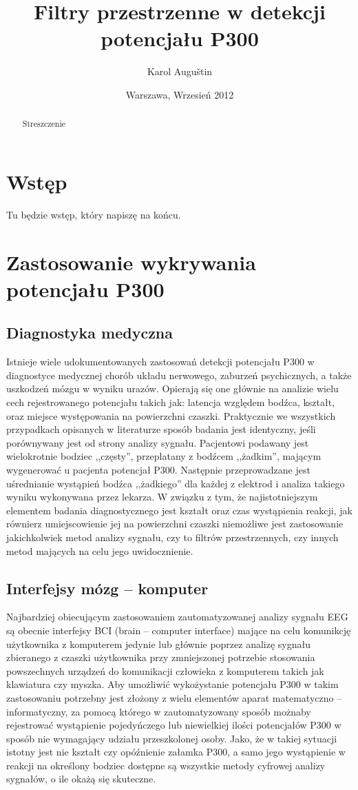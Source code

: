 \documentclass[licencjacka,openright]{pracamgr}
\author{ Karol Auguštin }
\title{ Filtry przestrzenne w detekcji potencjału P300 }
\date{Warszawa, Wrzesień 2012}
\begin{document}
\let\cleardoublepage\clearpage
\maketitle
\begin{abstract}
\par Streszczenie
\end{abstract}
\tableofcontents
\chapter{Wstęp}
Tu będzie wstęp, który napiszę na końcu.

\chapter{Zastosowanie wykrywania potencjału P300}
\section{Diagnostyka medyczna}
Istnieje wiele udokumentowanych zastosowań detekcji potencjału P300 w diagnostyce medycznej chorób układu nerwowego, zaburzeń psychicznych, a także uszkodzeń mózgu w wyniku urazów. \citep{zgorzalewicz2000} Opierają się one głównie na analizie wielu cech rejestrowanego potencjału takich jak: latencja względem bodźca, kształt, oraz miejsce występowania na powierzchni czaszki. Praktycznie we wszystkich przypadkach opisanych w literaturze sposób badania jest identyczny, jeśli porównywany jest od strony analizy sygnału. Pacjentowi podawany jest wielokrotnie bodziec ,,częsty'', przeplatany z bodźcem ,,żadkim'', mającym wygenerować u pacjenta potencjał P300. Następnie przeprowadzane jest uśrednianie wystąpień bodźca ,,żadkiego'' dla każdej z elektrod i analiza takiego wyniku wykonywana przez lekarza. W związku z tym, że najistotniejszym elementem badania diagnostycznego jest kształt oraz czas wystąpienia reakcji, jak równierz umiejscowienie jej na powierzchni czaszki niemożliwe jest zastosowanie jakichkolwiek metod analizy sygnału, czy to filtrów przestrzennych, czy innych metod mających na celu jego uwidocznienie.
\section{Interfejsy mózg -- komputer}
Najbardziej obiecującym zastosowaniem zautomatyzowanej analizy sygnału EEG są obecnie interfejsy BCI (brain -- computer interface) mające na celu komunikcję użytkownika z komputerem jedynie lub głównie poprzez analizę sygnału zbieranego z czaszki użytkownika przy zmniejszonej potrzebie stosowania powszechnych urządzeń do komunikacji człowieka z komputerem takich jak klawiatura czy myszka. Aby umożliwić wykożystanie potencjału P300 w takim zastosowaniu potrzebny jest złożony z wielu elementów aparat matematyczno -- informatyczny, za pomocą którego w zautomatyzowany sposób możnaby rejestrować wystąpienie pojedyńczego lub niewielkiej ilości potencjałów P300 w sposób nie wymagający udziału przeszkolonej osoby. Jako, że w takiej sytuacji istotny jest nie kształt czy opóźnienie załamka P300, a samo jego wystąpienie w reakcji na określony bodziec dostępne są wszystkie metody cyfrowej analizy sygnałów, o ile okażą się skuteczne.
\end{document}
